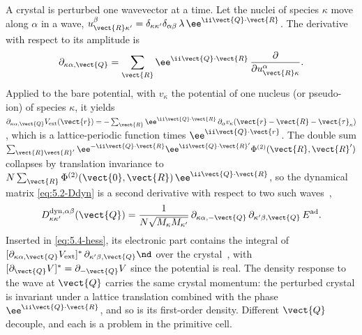 A crystal is perturbed one wavevector at a time. Let the nuclei of species $\kappa$ move along $\alpha$ in a wave, $u^\beta_{\vect{R}\kappa'} = \delta_{\kappa\kappa'}\delta_{\alpha\beta}\,\lambda\,\ee^{\ii\vect{Q}\cdot\vect{R}}$. The derivative with respect to its amplitude is
\begin{equation*}
  \partial_{\kappa\alpha,\vect{Q}} = \sum_{\vect{R}}\ee^{\ii\vect{Q}\cdot\vect{R}}\,\frac{\partial}{\partial u^\alpha_{\vect{R}\kappa}} .
\end{equation*}
Applied to the bare potential, with $v_\kappa$ the potential of one nucleus (or pseudo-ion) of species $\kappa$, it yields $\partial_{\kappa\alpha,\vect{Q}}V_{\mathrm{ext}}(\vect{r}) = -\sum_{\vect{R}}\ee^{\ii\vect{Q}\cdot\vect{R}}\,\partial_\alpha v_\kappa(\vect{r} - \vect{R} - \vect{\tau}_\kappa)$, which is a lattice-periodic function times $\ee^{\ii\vect{Q}\cdot\vect{r}}$. The double sum $\sum_{\vect{R}\vect{R}'}\ee^{-\ii\vect{Q}\cdot\vect{R}}\ee^{\ii\vect{Q}\cdot\vect{R}'}\Phi^{(2)}(\vect{R},\vect{R}')$ collapses by translation invariance to $N\sum_{\vect{R}}\Phi^{(2)}(\vect{0},\vect{R})\,\ee^{\ii\vect{Q}\cdot\vect{R}}$, so the dynamical matrix \cref{eq:5.2-Ddyn} is a second derivative with respect to two such waves~\cite[Eq.~(82)]{baroni2001phonons},
\begin{equation}
  D^{\mathrm{dyn},\alpha\beta}_{\kappa\kappa'}(\vect{Q}) = \frac{1}{N\sqrt{M_\kappa M_{\kappa'}}}\,\partial_{\kappa\alpha,-\vect{Q}}\,\partial_{\kappa'\beta,\vect{Q}}\,E^{\mathrm{ad}} .
  \label{eq:5.4-Dwave}
\end{equation}
Inserted in \cref{eq:5.4-hess}, its electronic part contains the integral of $[\partial_{\kappa\alpha,\vect{Q}}V_{\mathrm{ext}}]^*\,\partial_{\kappa'\beta,\vect{Q}}\nd$ over the crystal~\cite[Eq.~(86)]{baroni2001phonons}, with $[\partial_{\vect{Q}}V]^* = \partial_{-\vect{Q}}V$ since the potential is real. The density response to the wave at $\vect{Q}$ carries the same crystal momentum: the perturbed crystal is invariant under a lattice translation combined with the phase $\ee^{\ii\vect{Q}\cdot\vect{R}}$, and so is its first-order density. Different $\vect{Q}$ decouple, and each is a problem in the primitive cell.

